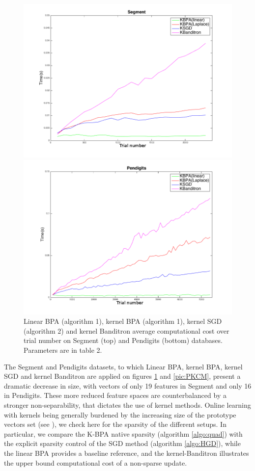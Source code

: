 \documentclass[preprint,12pt,authoryear]{elsarticle}
\begin{document}
\begin{figure}[htp]

	\centerline{
		\includegraphics[width=.7\linewidth]{figs/Segment_kernel_T.png}}
	\centerline{\includegraphics[width=.7\linewidth]{figs/Pendigits_kernel_T.png}}
\caption{Linear BPA (algorithm 1), kernel BPA (algorithm 1), kernel SGD (algorithm 2)  and kernel Banditron average computational cost over trial number on Segment (top) and Pendigits (bottom) databases. Parameters are in table 2.}
\label{pic:PKT}	
\end{figure}

The Segment and Pendigits datasets, to which Linear BPA, kernel BPA, kernel SGD and kernel Banditron are applied on figures \ref{pic:PKT} and \ref{pic:PKCM}, present a dramatic decrease in size, with vectors of only 19 features in Segment and only 16 in Pendigits.
These more reduced feature spaces are counterbalanced by a stronger non-separability, that dictates the use of kernel methods. 
Online learning with kernels being generally burdened by the increasing size of the prototype vectors set (see \cite{kivinen2004online}), we check here for the sparsity of the different setups. In particular, we compare the K-BPA native sparsity (algorithm \ref{algo:quad}) with the explicit sparsity control of the SGD method (algorithm \ref{algo:HGD}), while the linear BPA provides a baseline reference, and the kernel-Banditron illustrates the upper bound computational cost of a non-sparse update. 
\end{document}
